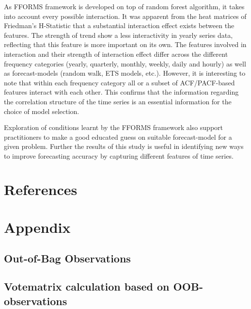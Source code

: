\documentclass[11pt,a4paper,]{article}
\begin{document}
As FFORMS framework is developed on top of random forest algorithm, it
takes into account every possible interaction. It was apparent from the
heat matrices of Friedman's H-Statistic that a substantial interaction
effect exists between the features. The strength of trend show a less
interactivity in yearly series data, reflecting that this feature is
more important on its own. The features involved in interaction and
their strength of interaction effect differ across the different
frequency categories (yearly, quarterly, monthly, weekly, daily and
hourly) as well as forecast-models (random walk, ETS models, etc.).
However, it is interesting to note that within each frequency category
all or a subset of ACF/PACF-based features interact with each other.
This confirms that the information regarding the correlation structure
of the time series is an essential information for the choice of model
selection.

Exploration of conditions learnt by the FFORMS framework also support
practitioners to make a good educated guess on suitable forecast-model
for a given problem. Further the results of this study is useful in
identifying new ways to improve forecasting accuracy by capturing
different features of time series.

\section{References}\label{references}

\section{Appendix}\label{appendix}

\subsection{Out-of-Bag Observations}\label{out-of-bag-observations}

\subsection{Votematrix calculation based on
OOB-observations}\label{votematrix-calculation-based-on-oob-observations}

\printbibliography
\end{document}
